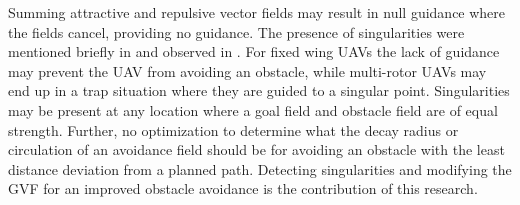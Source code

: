 \documentclass[numbered,pdftex]{ohio-etd}
\begin{document}
Summing attractive and repulsive vector fields may result in null guidance where the fields cancel, providing no guidance. The presence of singularities were mentioned briefly in \cite{nelson_cooperative_2005} and observed in \cite{panagou_motion_2014}. For fixed wing UAVs the lack of guidance may prevent the UAV from avoiding an obstacle, while multi-rotor UAVs may end up in a trap situation where they are guided to a singular point. Singularities may be present at any location where a goal field and obstacle field are of equal strength. Further, no optimization to determine what the decay radius or circulation of an avoidance field should be for avoiding an obstacle with the least distance deviation from a planned path. Detecting singularities and modifying the GVF for an improved obstacle avoidance is the contribution of this research.
\end{document}
